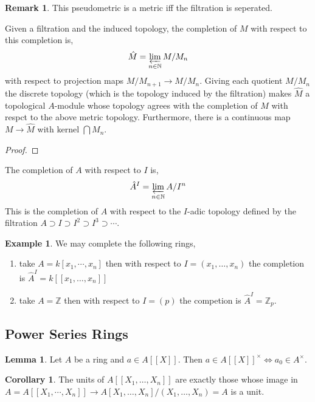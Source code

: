 \documentclass[12pt]{extarticle}
\newcommand{\Z}{\mathbb{Z}}
\newcommand{\N}{\mathbb{N}}
\theoremstyle{definition}
\newtheorem{lemma}[theorem]{Lemma}
\newtheorem{example}[theorem]{Example}
\newtheorem{corollary}[theorem]{Corollary}
\newtheorem{remark}{Remark}
\newenvironment{definition}[1][Definition:]{\begin{trivlist}
\item[\hskip \labelsep {\bfseries #1}]}{\end{trivlist}}
\begin{document}
\begin{remark}
This pseudometric is a metric iff the filtration is seperated. 
\end{remark}


\begin{definition}
Given a filtration and the induced topology, the completion of $M$ with respect to this completion is,
\[ \hat{M} = \varprojlim_{n \in \N} M / M_n \]
with respect to projection maps $M / M_{n+1} \to M / M_n$. Giving each quotient $M / M_n$ the discrete topology (which is the topology induced by the filtration) makes $\hat{M}$ a topological $A$-module whose topology agrees with the completion of $M$ with respct to the above metric topology. Furthermore, there is a continuous map $M \to \hat{M}$ with kernel $\bigcap M_n$. 
\end{definition}

\begin{proof}

\end{proof}

\begin{definition}
The completion of $A$ with respect to $I$ is,
\[ \hat{A}^I = \varprojlim_{n \in \N} A / I^n \]
This is the completion of $A$ with respect to the $I$-adic topology defined by the filtration $A \supset I \supset I^2 \supset I^3 \supset \cdots$. 
\end{definition}

\begin{example}
We may complete the following rings,
\begin{enumerate}
\item take $A = k[x_1, \cdots, x_n]$ then with respect to $I = (x_1, \dots, x_n)$ the completion is $\hat{A}^I = k[[x_1, \dots, x_n]]$
\item take $A = \Z$ then with respect to $I = (p)$ the competion is $\hat{A}^I = \Z_p$. 
\end{enumerate}
\end{example}

\subsection{Power Series Rings}

\begin{lemma}
Let $A$ be a ring and $a \in A[[X]]$. Then $a \in A[[X]]^\times \iff a_0 \in A^\times$.
\end{lemma}

\begin{corollary}
The units of $A[[X_1, \dots, X_n]]$ are exactly those whose image in $A = A[[X_1, \cdots, X_n]] \to A[X_1, \dots, X_n]/(X_1, \dots, X_n) = A$ is a unit.
\end{corollary}
\end{document}
